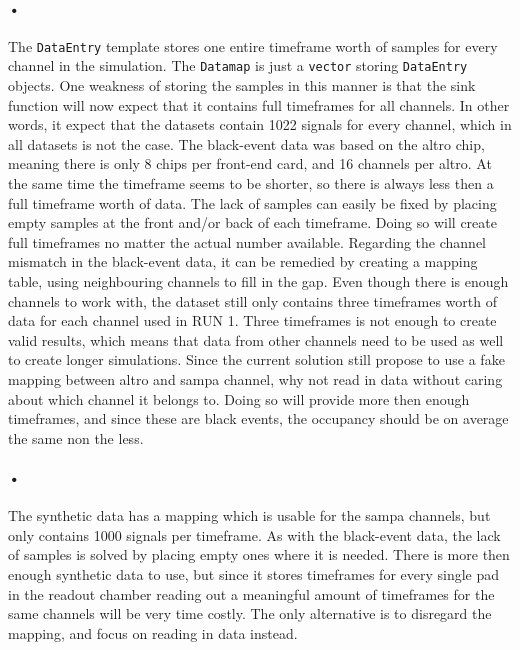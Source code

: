 \documentclass[a4paper, 12pt]{report}
\newcommand{\codeword}[1]{\texttt{#1}}
\begin{document}
\paragraph{•}
The \codeword{DataEntry} template stores one entire timeframe worth of samples for every channel in the simulation.
The \codeword{Datamap} is just a \codeword{vector} storing \codeword{DataEntry} objects.
One weakness of storing the samples in this manner is that the sink function will now expect that it contains full timeframes for all channels.
In other words, it expect that the datasets contain 1022 signals for every channel, which in all datasets is not the case.
The black-event data was based on the \gls{altro} chip, meaning there is only 8 chips per front-end card, and 16 channels per \gls{altro}.
At the same time the timeframe seems to be shorter, so there is always less then a full timeframe worth of data.
The lack of samples can easily be fixed by placing empty samples at the front and/or back of each timeframe.
Doing so will create full timeframes no matter the actual number available.
Regarding the channel mismatch in the black-event data, it can be remedied by creating a mapping table, using neighbouring channels to fill in the gap.
Even though there is enough channels to work with, the dataset still only contains three timeframes worth of data for each channel used in RUN 1.
Three timeframes is not enough to create valid results, which means that data from other channels need to be used as well to create longer simulations.
Since the current solution still propose to use a fake mapping between \gls{altro} and \gls{sampa} channel, why not read in data without caring about which channel it belongs to.
Doing so will provide more then enough timeframes, and since these are black events, the occupancy should be on average the same non the less.

\paragraph{•}
The synthetic data has a mapping which is usable for the \gls{sampa} channels, but only contains 1000 signals per timeframe.
As with the black-event data, the lack of samples is solved by placing empty ones where it is needed.
There is more then enough synthetic data to use, but since it stores timeframes for every single pad in the readout chamber reading out a meaningful amount of timeframes for the same channels will be very time costly.
The only alternative is to disregard the mapping, and focus on reading in data instead.
\end{document}
